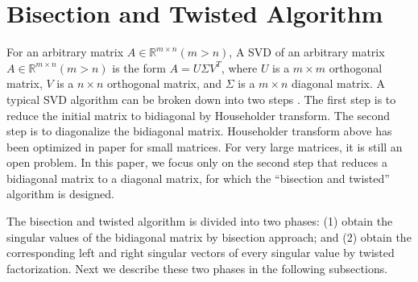 \vspace{-0.1in}
\section{Bisection and Twisted Algorithm} \label{sec:algorithm}
\vspace{-0.1in}
For an arbitrary matrix $A\in \mathbb{R}^{m \times n} (m>n)$, 
A SVD of an arbitrary matrix $A\in \mathbb{R}^{m \times n} (m>n)$ is the form $A = U \Sigma V^T$, where $U$ is a $m \times m$ orthogonal matrix, $V$ is a $n\times n$ orthogonal matrix, and $\Sigma$ is a $m\times n$ diagonal matrix.
A typical SVD algorithm can be broken down into two steps \cite{65SIAM}.
The first step is to reduce the initial matrix to bidiagonal by Householder transform.
The second step is to diagonalize the bidiagonal matrix.
Householder transform above has been optimized in paper \cite{LiuHouseholder} for small matrices. For very large matrices, it is still an open problem. 
In this paper, we focus only on the second step that reduces a bidiagonal matrix to a diagonal matrix, for which the  ``bisection and twisted'' algorithm is designed.

 
The bisection and twisted algorithm is divided into two phases:
(1) obtain the singular values of the bidiagonal matrix by bisection approach; and
(2) obtain the corresponding left and right singular vectors of every singular value by twisted factorization.
Next we describe these two phases in the following subsections.

\vspace{-0.1in}
